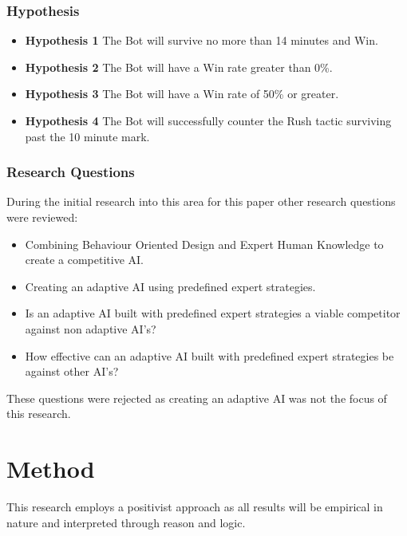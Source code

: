 \documentclass[journal]{IEEEtran}
\begin{document}
\subsubsection{Hypothesis}
\begin{itemize}
	\item \textbf{Hypothesis 1} The Bot will survive no more than 14 minutes and Win.
	\item \textbf{Hypothesis 2} The Bot will have a Win rate greater than 0\%.
	\item \textbf{Hypothesis 3} The Bot will have a Win rate of 50\% or greater.	
	\item \textbf{Hypothesis 4} The Bot will successfully counter the Rush tactic surviving past the 10 minute mark.
\end{itemize}

\subsubsection{Research Questions}
During the initial research into this area for this paper other research questions were reviewed:
\begin{itemize}
	\item Combining Behaviour Oriented Design and Expert Human Knowledge to create a competitive AI.
	
	\item Creating an adaptive AI using predefined expert strategies. 
	
	\item Is an adaptive AI built with predefined expert strategies a viable competitor against non adaptive AI’s?
	
	\item How effective can an adaptive AI built with predefined expert strategies be against other AI’s?	
\end{itemize}
These questions were rejected as creating an adaptive AI was not the focus of this research.
\newline

\section{Method}


This research employs a positivist approach as all results will be empirical in nature and interpreted through reason and logic.
\end{document}
